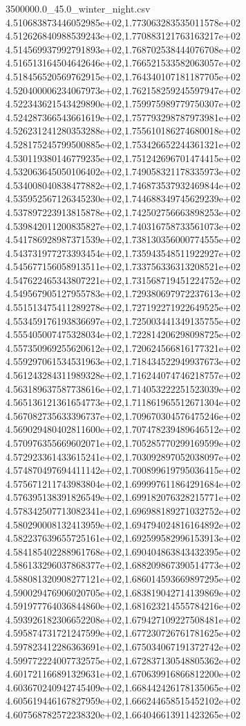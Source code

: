 \begin{filecontents*}{3500000.0_45.0_winter_night.csv}
4.510683873446052985e+02,1.773063283535011578e+02
4.512626840988539243e+02,1.770883121763163217e+02
4.514569937992791893e+02,1.768702538444076708e+02
4.516513164504642646e+02,1.766521533582063057e+02
4.518456520569762915e+02,1.764340107181187705e+02
4.520400006234067973e+02,1.762158259245597947e+02
4.522343621543429890e+02,1.759975989779750307e+02
4.524287366543661619e+02,1.757793298787973981e+02
4.526231241280353288e+02,1.755610186274680018e+02
4.528175245799500885e+02,1.753426652244361321e+02
4.530119380146779235e+02,1.751242696701474415e+02
4.532063645050106402e+02,1.749058321178335973e+02
4.534008040838477882e+02,1.746873537932469844e+02
4.535952567126345230e+02,1.744688349745629239e+02
4.537897223913815878e+02,1.742502756663898253e+02
4.539842011200835827e+02,1.740316758733561073e+02
4.541786928987371539e+02,1.738130356000774555e+02
4.543731977273393454e+02,1.735943548511922927e+02
4.545677156058913511e+02,1.733756336313208521e+02
4.547622465343807221e+02,1.731568719451224752e+02
4.549567905127955783e+02,1.729380697972237613e+02
4.551513475411289278e+02,1.727192271922649525e+02
4.553459176193836697e+02,1.725003441349135755e+02
4.555405007475328034e+02,1.722814206298098725e+02
4.557350969255620612e+02,1.720624566816177321e+02
4.559297061534531963e+02,1.718434522949937673e+02
4.561243284311989328e+02,1.716244074746218757e+02
4.563189637587738616e+02,1.714053222251523039e+02
4.565136121361654773e+02,1.711861965512671304e+02
4.567082735633396737e+02,1.709670304576475246e+02
4.569029480402811600e+02,1.707478239489646512e+02
4.570976355669602071e+02,1.705285770299169599e+02
4.572923361433615241e+02,1.703092897052038097e+02
4.574870497694411142e+02,1.700899619795036415e+02
4.575671211743983804e+02,1.699997611864291684e+02
4.576395138391826549e+02,1.699182076328215771e+02
4.578342507713082341e+02,1.696988189271032752e+02
4.580290008132413959e+02,1.694794024816164892e+02
4.582237639655725161e+02,1.692599582996153913e+02
4.584185402288961768e+02,1.690404863843432395e+02
4.586133296037868377e+02,1.688209867390514773e+02
4.588081320908277121e+02,1.686014593669897295e+02
4.590029476906020705e+02,1.683819042714139869e+02
4.591977764036844860e+02,1.681623214555784216e+02
4.593926182306652208e+02,1.679427109227508481e+02
4.595874731721247599e+02,1.677230726761781625e+02
4.597823412286363691e+02,1.675034067191372742e+02
4.599772224007732575e+02,1.672837130548805362e+02
4.601721166891329631e+02,1.670639916866812200e+02
4.603670240942745409e+02,1.668442426178135065e+02
4.605619446167827959e+02,1.666244658515452102e+02
4.607568782572238320e+02,1.664046613911423265e+02

\end{filecontents*}
